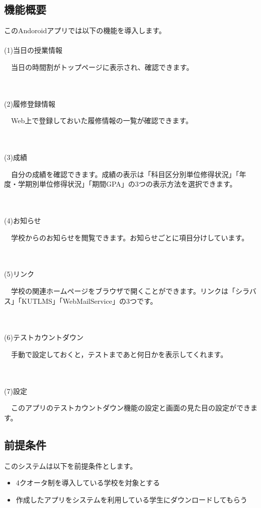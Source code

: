\subsection{機能概要}
このAndoroidアプリでは以下の機能を導入します。\\ \\
(1)当日の授業情報\\
\hspace{5mm}
\begin{minipage}[h]{145mm}
　当日の時間割がトップページに表示され、確認できます。
\end{minipage}
\\ \\
(2)履修登録情報\\
\hspace{5mm}
\begin{minipage}[h]{145mm}
　Web上で登録しておいた履修情報の一覧が確認できます。
\end{minipage}
\\ \\
(3)成績\\
\hspace{5mm}
\begin{minipage}[h]{145mm}
　自分の成績を確認できます。成績の表示は「科目区分別単位修得状況」「年度・学期別単位修得状況」「期間GPA」の3つの表示方法を選択できます。
\end{minipage}
\\ \\
(4)お知らせ\\
\hspace{5mm}
\begin{minipage}[h]{145mm}
　学校からのお知らせを閲覧できます。お知らせごとに項目分けしています。
\end{minipage}
\\ \\
(5)リンク\\
\hspace{5mm}
\begin{minipage}[h]{145mm}
　学校の関連ホームページをブラウザで開くことができます。リンクは「シラバス」「KUTLMS」「WebMailService」の3つです。
\end{minipage}
\\ \\
(6)テストカウントダウン\\
\hspace{5mm}
\begin{minipage}[h]{145mm}
　手動で設定しておくと，テストまであと何日かを表示してくれます。
\end{minipage}
\\ \\
(7)設定\\
\hspace{5mm}
\begin{minipage}[h]{145mm}
 　このアプリのテストカウントダウン機能の設定と画面の見た目の設定ができます。
\end{minipage}

\subsection{前提条件}
このシステムは以下を前提条件とします。
\begin{itemize}
\item 4クオータ制を導入している学校を対象とする
\item 作成したアプリをシステムを利用している学生にダウンロードしてもらう
\end{itemize}
